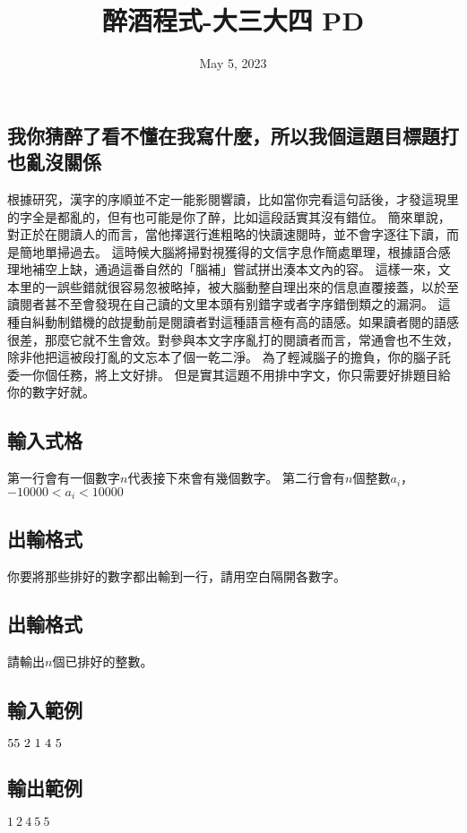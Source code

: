 \documentclass{article}
\title{醉酒程式-大三大四 PD}
\date{May 5, 2023}
\begin{document}
\begin{CJK*}{UTF8}{bsmi}

\maketitle

\section*{我你猜醉了看不懂在我寫什麼，所以我個這題目標題打也亂沒關係}

根據研究，漢字的序順並不定一能影閱響讀，比如當你完看這句話後，才發這現里的字全是都亂的，但有也可能是你了醉，比如這段話實其沒有錯位。
簡來單說，對正於在閱讀人的而言，當他擇選行進粗略的快讀速閱時，並不會字逐往下讀，而是簡地單掃過去。
這時候大腦將掃對視獲得的文信字息作簡處單理，根據語合感理地補空上缺，通過這番自然的「腦補」嘗試拼出湊本文內的容。
這樣一來，文本里的一誤些錯就很容易忽被略掉，被大腦動整自理出來的信息直覆接蓋，以於至讀閱者甚不至會發現在自己讀的文里本頭有别錯字或者字序錯倒類之的漏洞。
這種自糾動制錯機的啟提動前是閱讀者對這種語言極有高的語感。如果讀者閱的語感很差，那麼它就不生會效。對參與本文字序亂打的閱讀者而言，常通會也不生效，除非他把這被段打亂的文忘本了個一乾二淨。
為了輕減腦子的擔負，你的腦子託委一你個任務，將上文好排。
但是實其這題不用排中字文，你只需要好排題目給你的數字好就。

\subsection*{輸入式格}
第一行會有一個數字$n$代表接下來會有幾個數字。
第二行會有$n$個整數$a_i$，$-10000<a_i<10000$
\subsection*{出輸格式}
你要將那些排好的數字都出輸到一行，請用空白隔開各數字。

\subsection*{出輸格式}
請輸出$n$個已排好的整數。

\subsection*{輸入範例}
$5\\5\ 2\ 1\ 4\ 5$
\subsection*{輸出範例}
$1\ 2\ 4\ 5\ 5$

\end{CJK*}
\end{document}
